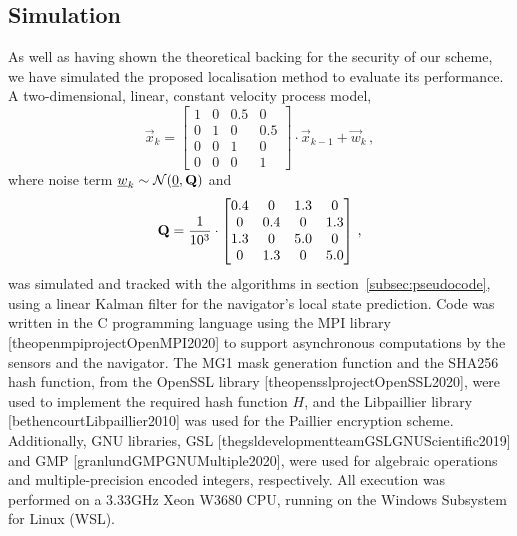 \subsection{Simulation}\label{subsec:nonlin_fusion:simulation}
As well as having shown the theoretical backing for the security of our scheme, we have simulated the proposed localisation method to evaluate its performance. A two-dimensional, linear, constant velocity process model,
\begin{equation*}
    \vec{x}_{k} = 
    \begin{bmatrix}
        1 & 0 & 0.5 & 0\\
        0 & 1 & 0 & 0.5\\
        0 & 0 & 1 & 0\\
        0 & 0 & 0 & 1
    \end{bmatrix} \cdot \vec{x}_{k-1} + \vec{w}_k\,,
\end{equation*}
where noise term ${\underline{w}}_k \sim \mathcal{N}({\underline{0}}, {{\mathbf{Q}}})$ and
\begin{equation*}
    {\ensuremath{{\mathbf{Q}}}} = \frac{1}{10^3} \cdot
    \begin{bmatrix}
        0.4 & 0 & 1.3 & 0\\
        0 & 0.4 & 0 & 1.3\\
        1.3 & 0 & 5.0 & 0\\
        0 & 1.3 & 0 & 5.0
    \end{bmatrix}\,,
\end{equation*}
was simulated and tracked with the algorithms in section~\ref{subsec:pseudocode}, using a linear Kalman filter for the navigator's local state prediction. Code was written in the C programming language using the MPI library [theopenmpiprojectOpenMPI2020] to support asynchronous computations by the sensors and the navigator. The MG1 mask generation function and the SHA256 hash function, from the OpenSSL library [theopensslprojectOpenSSL2020], were used to implement the required hash function $H$, and the Libpaillier library [bethencourtLibpaillier2010] was used for the Paillier encryption scheme. Additionally, GNU libraries, GSL [thegsldevelopmentteamGSLGNUScientific2019] and GMP [granlundGMPGNUMultiple2020], were used for algebraic operations and multiple-precision encoded integers, respectively. All execution was performed on a 3.33GHz Xeon W3680 CPU, running on the Windows Subsystem for Linux (WSL).

